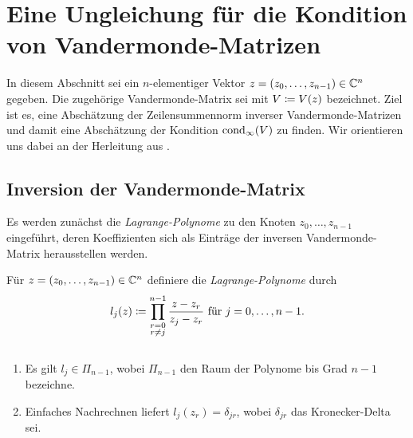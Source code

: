 \chapter{Eine Ungleichung für die Kondition von Vandermonde-Matrizen}
In diesem Abschnitt sei ein $n$-elementiger Vektor $z = (z_0, \dots, z_{n-1})
\in \Cn$ gegeben.  Die zugehörige Vandermonde-Matrix sei mit $V \defeq
\Vand{z}$ bezeichnet.  Ziel ist es, eine Abschätzung der Zeilensummennorm
inverser Vandermonde-Matrizen und damit eine Abschätzung der
Kondition $\cond[\infty]{V}$ zu finden.
Wir orientieren uns dabei an der Herleitung aus \cite{gautschi1}.

\section{Inversion der Vandermonde-Matrix}
Es werden zunächst die \emph{Lagrange-Polynome} zu den Knoten
$z_0, \dots, z_{n-1}$ eingeführt, deren Koeffizienten sich als Einträge der
inversen Vandermonde-Matrix herausstellen werden.

\begin{mydef}
    Für $ z = (z_0, \dots, z_{n-1}) \in \Cn $ definiere die
    \emph{Lagrange-Polynome} durch
    \[
        l_j(z)
        \defeq \prod_{\substack{r=0\\ r \neq j}}^{n-1} \frac{z - z_r}{z_j - z_r} \text{ für } j = 0, \dots, n-1.
    \]
\end{mydef}

\begin{remark}
    $ \; $
    \begin{enumerate}
        \item Es gilt $l_j \in \Pi_{n-1}$, wobei $\Pi_{n-1}$ den Raum der Polynome bis
        Grad $n-1$ bezeichne.
        \item  Einfaches Nachrechnen liefert
        $l_j(z_r) = \delta_{jr}$, wobei $\delta_{jr}$ das Kronecker-Delta
        sei.
    \end{enumerate}
\end{remark}

